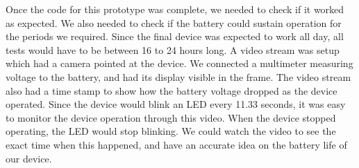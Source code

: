 Once the code for this prototype was complete, we needed to check if it worked as expected.
We also needed to check if the battery could sustain operation for the periods we required.
Since the final device was expected to work all day,
all tests would have to be between 16 to 24 hours long.
A video stream was setup which had a camera pointed at the device.
We connected a multimeter measuring voltage to the battery,
and had its display visible in the frame.
The video stream also had a time stamp to show how the battery voltage dropped as the device operated.
Since the device would blink an LED every 11.33 seconds,
it was easy to monitor the device operation through this video.
When the device stopped operating,
the LED would stop blinking.
We could watch the video to see the exact time when this happened,
and have an accurate idea on the battery life of our device.

